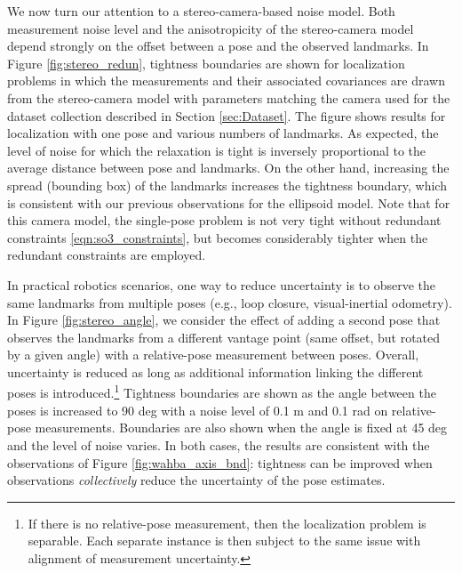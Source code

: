 \documentclass[lettersize,journal]{IEEEtran}
\begin{document}
We now turn our attention to a stereo-camera-based noise model. Both measurement noise level and the anisotropicity of the stereo-camera model depend strongly on the offset between a pose and the observed landmarks. In Figure \ref{fig:stereo_redun}, tightness boundaries are shown for localization problems in which the measurements and their associated covariances are drawn from the stereo-camera model with parameters matching the camera used for the dataset collection described in Section \ref{sec:Dataset}. The figure shows results for localization with one pose and various numbers of landmarks. As expected, the level of noise for which the relaxation is tight is inversely proportional to the average distance between pose and landmarks. On the other hand, increasing the spread (bounding box) of the landmarks increases the tightness boundary, which is consistent with our previous observations for the ellipsoid model. Note that for this camera model, the single-pose problem is not very tight without redundant constraints \eqref{eqn:so3_constraints}, but becomes considerably tighter when the redundant constraints are employed.

In practical robotics scenarios, one way to reduce uncertainty is to observe the same landmarks from multiple poses (e.g., loop closure, visual-inertial odometry). In Figure \ref{fig:stereo_angle}, we consider the effect of adding a second pose that observes the landmarks from a different vantage point (same offset, but rotated by a given angle) with a relative-pose measurement between poses. Overall, uncertainty is reduced as long as additional information linking the different poses is introduced.\footnote{If there is no relative-pose measurement, then the localization problem is separable. Each separate instance is then subject to the same issue with alignment of measurement uncertainty.} Tightness boundaries are shown as the angle between the poses is increased to 90 deg with a noise level of 0.1 m and 0.1 rad on relative-pose measurements. Boundaries are also shown when the angle is fixed at 45 deg and the level of noise varies. In both cases, the results are consistent with the observations of Figure \ref{fig:wahba_axis_bnd}: tightness can be improved when observations \emph{collectively} reduce the uncertainty of the pose estimates.
\end{document}
